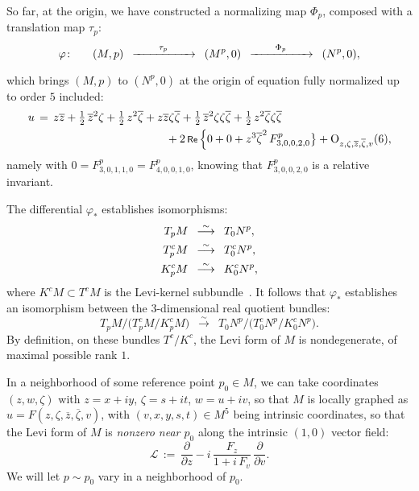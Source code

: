 \documentclass[12pt,twoside,leqno,openany]{amsart}
\begin{document}
\label{order-1-chains}

So far, at the origin,  
we have constructed a normalizing map $\Phi_p$,
composed with a translation map $\tau_p$:
\[
\varphi
\colon\ \ \ \ \
(M,p)
\,\,\,\xrightarrow[{\rule[0pt]{50pt}{0pt}}]{\tau_p}\,\,\,
(M^p,0)
\,\,\,\xrightarrow[{\rule[0pt]{50pt}{0pt}}]{\Phi_p}\,\,\,
(N^p,0),
\]
which brings $(M, p)$ to $(N^p, 0)$ at the origin of equation
fully normalized up to order $5$ included:
\[
\aligned
u
&
\,=\,
z\overline{z}
+
\tfrac{1}{2}\,\overline{z}^2\zeta
+
\tfrac{1}{2}\,z^2\overline{\zeta}
+
z\overline{z}\zeta\overline{\zeta}
+
\tfrac{1}{2}\,\overline{z}^2\zeta\zeta\overline{\zeta}
+
\tfrac{1}{2}\,z^2\overline{\zeta}\zeta\overline{\zeta}
\\
&
\ \ \ \ \ \ \ \ \ \ \ \ \ \ \ \ \ \ \ \ \ \ \ \ \ \ \ \ \ \ \ \ \ \ \
+
2\,\Re\,
\Big\{
0
+
0
+
z^3\overline{\zeta}^2\,
F_{3,0,0,2,0}^p
\big\}
+
{\rm O}_{z,\zeta,\overline{z},\overline{\zeta},v}(6),
\endaligned
\]
namely with $0 = F_{3,0,1,1,0}^p = F_{4,0,0,1,0}^p$,
knowing that $F_{3,0,0,2,0}^p$ is a relative invariant. 

The differential $\varphi_\ast$ establishes isomorphisms:
\[
\aligned
T_pM
&
\,\,\,\overset{\sim}{\longrightarrow}\,\,\,
T_0N^p,
\\
T_p^cM
&
\,\,\,\overset{\sim}{\longrightarrow}\,\,\,
T_0^cN^p,
\\
K_p^cM
&
\,\,\,\overset{\sim}{\longrightarrow}\,\,\,
K_0^cN^p,
\endaligned
\]
where $K^cM \subset T^cM$ is the Levi-kernel 
subbundle~{\cite{Merker-Pocchiola-Sabzevari-2013-5-CR-II}}.
It follows that $\varphi_\ast$ establishes an isomorphism
between the $3$-dimensional real quotient bundles:
\[
T_pM
\Big/
\big(
T_p^cM\big/K_p^cM
\big)
\,\,\,\overset{\sim}{\longrightarrow}\,\,\,
T_0N^p
\Big/
\big(
T_0^cN^p\big/K_0^cN^p
\big).
\]
By definition, on these bundles $T^c / K^c$, the Levi form 
of $M$ is nondegenerate,
of maximal possible rank $1$.

In a neighborhood of some reference point $p_0 \in M$,
we can take coordinates $(z, w, \zeta)$ with $z = x + iy$,
$\zeta = s + it$, $w = u + iv$, so that
$M$ is locally graphed as $u = F(z, \zeta, \overline{z}, 
\overline{\zeta}, v)$, with $(v, x, y, s, t) \in M^5$
being intrinsic coordinates, so that the
Levi form of $M$ is {\em nonzero near $p_0$} along the  
intrinsic $(1,0)$ vector field:
\[
\mathcal{L}
\,:=\,
\frac{\partial}{\partial z}
-
i\,\frac{F_z}{1+i\,F_v}\,
\frac{\partial}{\partial v}.
\]
We will let $p \sim p_0$ vary in a neighborhood of $p_0$.
\end{document}

